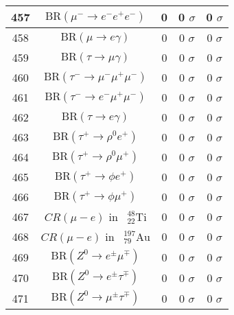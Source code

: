 \begin{longtable}{|c|c|c|c|c|}
457 &	 $\mathrm{BR}(\mu^-\to e^-e^+e^-)$ &	 0 &	 0 $ \sigma$ &	 0 $ \sigma$ \\ \hline
458 &	 $\mathrm{BR}(\mu\to e\gamma)$ &	 0 &	 0 $ \sigma$ &	 0 $ \sigma$ \\ \hline
459 &	 $\mathrm{BR}(\tau\to \mu\gamma)$ &	 0 &	 0 $ \sigma$ &	 0 $ \sigma$ \\ \hline
460 &	 $\mathrm{BR}(\tau^-\to \mu^-\mu^+\mu^-)$ &	 0 &	 0 $ \sigma$ &	 0 $ \sigma$ \\ \hline
461 &	 $\mathrm{BR}(\tau^-\to e^-\mu^+\mu^-)$ &	 0 &	 0 $ \sigma$ &	 0 $ \sigma$ \\ \hline
462 &	 $\mathrm{BR}(\tau\to e\gamma)$ &	 0 &	 0 $ \sigma$ &	 0 $ \sigma$ \\ \hline
463 &	 $\mathrm{BR}(\tau^+\to \rho^0 e^+)$ &	 0 &	 0 $ \sigma$ &	 0 $ \sigma$ \\ \hline
464 &	 $\mathrm{BR}(\tau^+\to \rho^0\mu^+)$ &	 0 &	 0 $ \sigma$ &	 0 $ \sigma$ \\ \hline
465 &	 $\mathrm{BR}(\tau^+\to \phi e^+)$ &	 0 &	 0 $ \sigma$ &	 0 $ \sigma$ \\ \hline
466 &	 $\mathrm{BR}(\tau^+\to \phi\mu^+)$ &	 0 &	 0 $ \sigma$ &	 0 $ \sigma$ \\ \hline
467 &	 $CR(\mu - e)$ in $\phantom k^{48}_{22} \mathrm{Ti}$ &	 0 &	 0 $ \sigma$ &	 0 $ \sigma$ \\ \hline
468 &	 $CR(\mu - e)$ in $\phantom k^{197}_{79} \mathrm{Au}$ &	 0 &	 0 $ \sigma$ &	 0 $ \sigma$ \\ \hline
469 &	 $\mathrm{BR}(Z^0\to  e^\pm\mu^\mp)$ &	 0 &	 0 $ \sigma$ &	 0 $ \sigma$ \\ \hline
470 &	 $\mathrm{BR}(Z^0\to  e^\pm\tau^\mp)$ &	 0 &	 0 $ \sigma$ &	 0 $ \sigma$ \\ \hline
471 &	 $\mathrm{BR}(Z^0\to \mu^\pm\tau^\mp)$ &	 0 &	 0 $ \sigma$ &	 0 $ \sigma$ \\ \hline
\end{longtable}
